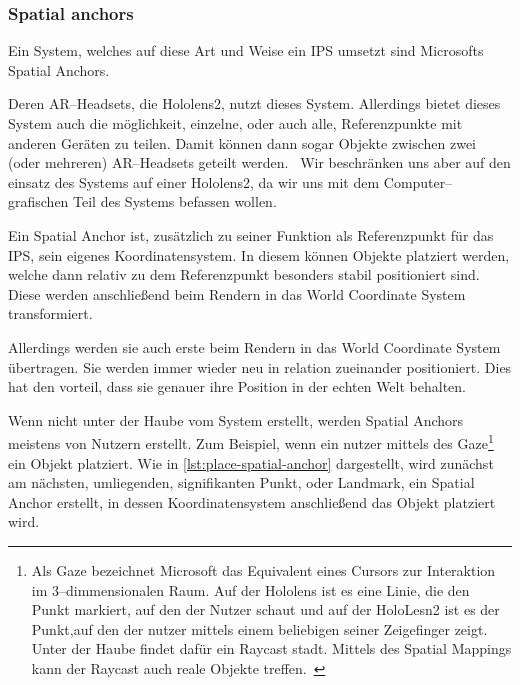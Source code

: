     \subsubsection{Spatial anchors}\label{subsubsec:spatial-anchors}
        Ein System, welches auf diese Art und Weise ein IPS umsetzt sind Microsofts Spatial Anchors.~\autocite{thetuvix-2023B}

        Deren AR--Headsets, die Hololens2, nutzt dieses System.
        Allerdings bietet dieses System auch die möglichkeit, einzelne, oder auch alle, Referenzpunkte mit anderen Geräten zu teilen.
        Damit können dann sogar Objekte zwischen zwei (oder mehreren) AR--Headsets geteilt werden.~\autocite{pamistel-2022}
        Wir beschränken uns aber auf den einsatz des Systems auf einer Hololens2, da wir uns mit dem Computer--grafischen Teil des Systems befassen wollen.

        Ein Spatial Anchor ist, zusätzlich zu seiner Funktion als Referenzpunkt für das IPS, sein eigenes Koordinatensystem.
        In diesem können Objekte platziert werden, welche dann relativ zu dem Referenzpunkt besonders stabil positioniert sind.
        Diese werden anschließend beim Rendern in das World Coordinate System transformiert.

        Allerdings werden sie auch erste beim Rendern in das World Coordinate System übertragen.
        Sie werden immer wieder neu in relation zueinander positioniert.
        Dies hat den vorteil, dass sie genauer ihre Position in der echten Welt behalten.

        Wenn nicht unter der Haube vom System erstellt, werden Spatial Anchors meistens von Nutzern erstellt.
        Zum Beispiel, wenn ein nutzer mittels des Gaze\footnote{Als Gaze bezeichnet Microsoft das Equivalent eines Cursors zur Interaktion im 3--dimmensionalen Raum. Auf der Hololens ist es eine Linie, die den Punkt markiert, auf den der Nutzer schaut und auf der HoloLesn2 ist es der Punkt,auf den der nutzer mittels einem beliebigen seiner Zeigefinger zeigt.~\autocite{sostel-2023} Unter der Haube findet dafür ein Raycast stadt. Mittels des Spatial Mappings kann der Raycast auch reale Objekte treffen.~\autocite{mattzmsft-2023}} ein Objekt platziert.
        Wie in \autoref{lst:place-spatial-anchor} dargestellt, wird zunächst am nächsten, umliegenden, signifikanten Punkt, oder Landmark, ein Spatial Anchor erstellt, in dessen Koordinatensystem anschließend das Objekt platziert wird.

        

